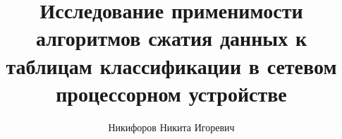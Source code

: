 \title{Исследование применимости алгоритмов сжатия данных к таблицам классификации в сетевом процессорном устройстве}
\author{Никифоров Никита Игоревич}

\makeatletter
\renewcommand\@maketitle{
	\begin{titlepage}
		\begin{center}
			\texttt{[image: msu]} \\
		Московский государственный университет имени М.\,В. Ломоносова
			\\
			Факультет вычислительной математики и кибернетики \\
			Кафедра автоматизации систем вычислительных комплексов \\
			
			\vspace{8em}
			
			{\Large \@author} \\[1.5em]
			{\LARGE \textbf{\@title} \par}
			
			\vspace{4.5em}
			
			{\Large \textsc{выпускная квалификационная работа}}
			
			\vfill
			
			\begin{flushright}
				{\large
					\textbf{Научный руководитель}:\\
					к.\,ф.-м.\,н., доцент\\
					Д.\,Ю.~Волканов\\
				}
			\end{flushright}
			\vfill
			
			Москва, 2021
		\end{center}
	\end{titlepage}
}
\makeatother

\maketitle
\setcounter{page}{2}
